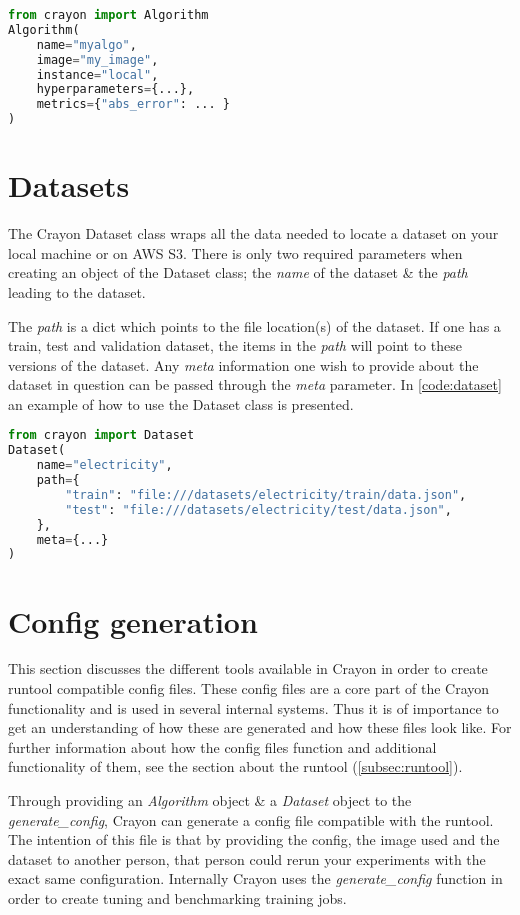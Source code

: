 \begin{lstlisting}[language=Python, label={code:algorithm}, caption=Example of the Algorithm class.]
from crayon import Algorithm
Algorithm(
    name="myalgo", 
    image="my_image", 
    instance="local",
    hyperparameters={...},
    metrics={"abs_error": ... }
)
\end{lstlisting}

\section{Datasets}
\label{crayon:datasets}
The Crayon Dataset class wraps all the data needed to locate a dataset on your local machine or on AWS S3. There is only two required parameters when creating an object of the Dataset class; the \textit{name} of the dataset \& the \textit{path} leading to the dataset.

The \textit{path} is a dict which points to the file location(s) of the dataset. If one has a train, test and validation dataset, the items in the \textit{path} will point to these versions of the dataset. Any \textit{meta} information one wish to provide about the dataset in question can be passed through the \textit{meta} parameter. In \ref{code:dataset} an example of how to use the Dataset class is presented.
\begin{lstlisting}[language=Python, label={code:dataset}, caption=Example of the Dataset class.]
from crayon import Dataset
Dataset(
    name="electricity",
    path={
        "train": "file:///datasets/electricity/train/data.json",
        "test": "file:///datasets/electricity/test/data.json",
    },
    meta={...}
)
\end{lstlisting}

\section{Config generation}
\label{'subsub:config_generation'}
This section discusses the different tools available in Crayon in order to create runtool compatible config files. These config files are a core part of the Crayon functionality and is used in several internal systems. Thus it is of importance to get an understanding of how these are generated and how these files look like. For further information about how the config files function and additional functionality of them, see the section about the runtool (\ref{subsec:runtool}).

Through providing an \textit{Algorithm} object \& a \textit{Dataset} object to the \textit{generate\_config}, Crayon can generate a config file compatible with the runtool.  The intention of this file is that by providing the config, the image used and the dataset to another person, that person could rerun your experiments with the exact same configuration. Internally Crayon uses the \textit{generate\_config} function in order to create tuning and benchmarking training jobs.

